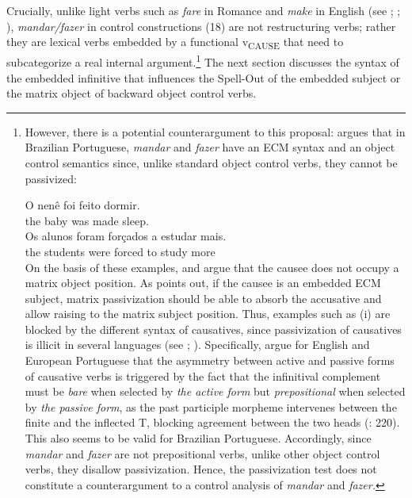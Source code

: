 \documentclass[output=paper]{langsci/langscibook}
\begin{document}
Crucially, unlike light verbs such as \textit{fare} in Romance and \textit{make} in English (see \citealt{Guasti1996}; \citealt{Folli2007}; \citealt{Pylkkänen2002,Pylkkänen2008}), \textit{mandar\slash fazer} in control constructions (18) are not restructuring verbs; rather they are lexical verbs embedded by a functional v\textsubscript{CAUSE}  that need to subcategorize a real internal argument.\footnote{However, there is a potential counterargument to this proposal: \citet{Farrell1995} argues that in Brazilian Portuguese, \textit{mandar} and \textit{fazer} have an ECM syntax and an object control semantics since, unlike standard object control verbs, they cannot be passivized:

\ea\gll * O nenê   foi feito    dormir.\\
          {}  the baby  was made  sleep.\\
\z
\ea\gll {} Os alunos  foram forçados  a  estudar  mais.\\
         {}  the students were  forced to study  more\\
\z
On the basis of these examples, \citet{Farrell1995} and \citet{Hornstein2003} argue that the causee does not occupy a matrix object position. As \citet{Landau2004} points out, if the causee is an embedded ECM subject, matrix passivization should be able to absorb the accusative and allow raising to the matrix subject position.   Thus, examples such as (i) are blocked by the different syntax of causatives, since passivization of causatives is illicit in several languages (see \citealt{Landau2004}; \citealt{Hornstein2008}). Specifically, \citet{Hornstein2008} argue for English and European Portuguese that the asymmetry between active and passive forms of causative verbs is triggered by the fact that the infinitival complement must be \textit{bare} when selected by \textit{the active form} but \textit{prepositional} when selected by \textit{the passive form}, as the past participle morpheme intervenes between the finite and the inflected T, blocking agreement between the two heads (\citealt{Hornstein2008}: 220).  This also seems to be valid for Brazilian Portuguese. Accordingly, since \textit{mandar} and \textit{fazer} are not prepositional verbs, unlike other object control verbs, they disallow passivization. Hence, the passivization test does not constitute a counterargument to a control analysis of \textit{mandar} and \textit{fazer.}} The next section discusses the syntax of the embedded infinitive that influences the Spell-Out of the embedded subject or the matrix object of backward object control verbs. 
\end{document}
